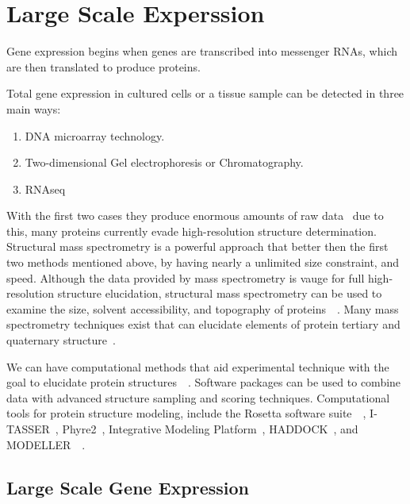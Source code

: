 \documentclass{report}
\begin{document}
\section{Large Scale Experssion}

Gene expression begins when genes are transcribed into messenger RNAs, which are then translated to produce proteins. 

Total gene expression in cultured cells or a tissue sample can be detected in three main ways:

\begin{enumerate}
    \item DNA microarray technology.
    \item Two-dimensional Gel electrophoresis or Chromatography.
    \item RNAseq
\end{enumerate}

With the first two cases they produce enormous amounts of raw data~\cite{zvelebil_understanding_2008} due to this, many proteins currently evade high-resolution structure determination. Structural mass spectrometry is a powerful approach that better then the first two methods mentioned above, by having nearly a unlimited size constraint, and speed. Although the data provided by mass spectrometry is vauge for full high-resolution structure elucidation, structural mass spectrometry can be used to examine the size, solvent accessibility, and topography of proteins~\cite{limpikirati_covalent_2018}~\cite{liu_mass_2020}.  Many mass spectrometry techniques exist that can elucidate elements of protein tertiary and quaternary structure~\cite{biehn_protein_2022}.

We can have computational methods that aid experimental technique with the goal to elucidate protein structures~\cite{seffernick_hybrid_2020}~\cite{leman_macromolecular_2020}. Software packages can be used to combine data with advanced structure sampling and scoring techniques. Computational tools for protein structure modeling, include the Rosetta software suite~\cite{leman_macromolecular_2020}~\cite{alford_rosetta_2017}, I-TASSER~\cite{yang_i-tasser_2015}, Phyre2~\cite{kelley_phyre2_2015}, Integrative Modeling Platform~\cite{russel_putting_2012}, HADDOCK~\cite{dominguez_haddock_2003}, and MODELLER~\cite{eswar_comparative_2006}~\cite{biehn_protein_2022}.

\subsection{Large Scale Gene Expression}
\end{document}
